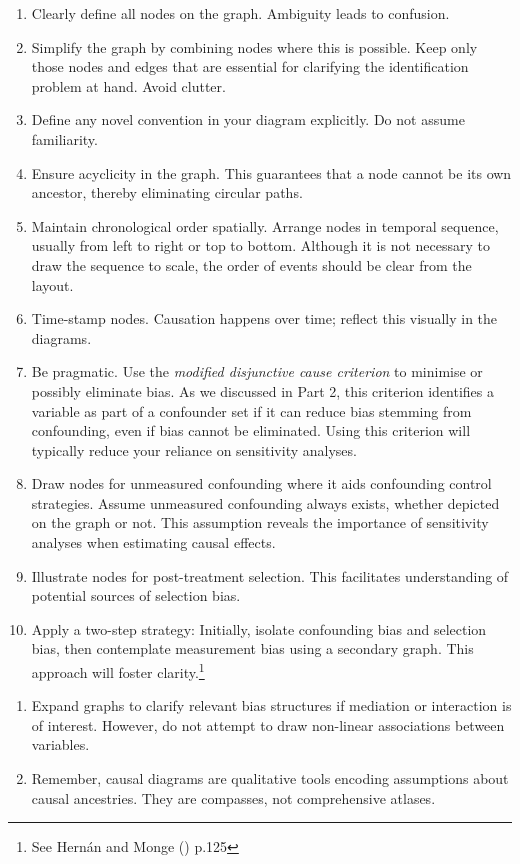 \documentclass[
  singlecolumn,
  9pt]{article}
\begin{document}
\begin{enumerate}
\def\labelenumi{\arabic{enumi}.}
\item
  Clearly define all nodes on the graph. Ambiguity leads to confusion.
\item
  Simplify the graph by combining nodes where this is possible. Keep
  only those nodes and edges that are essential for clarifying the
  identification problem at hand. Avoid clutter.
\item
  Define any novel convention in your diagram explicitly. Do not assume
  familiarity.
\item
  Ensure acyclicity in the graph. This guarantees that a node cannot be
  its own ancestor, thereby eliminating circular paths.
\item
  Maintain chronological order spatially. Arrange nodes in temporal
  sequence, usually from left to right or top to bottom. Although it is
  not necessary to draw the sequence to scale, the order of events
  should be clear from the layout.
\item
  Time-stamp nodes. Causation happens over time; reflect this visually
  in the diagrams.
\item
  Be pragmatic. Use the \emph{modified disjunctive cause criterion} to
  minimise or possibly eliminate bias. As we discussed in Part 2, this
  criterion identifies a variable as part of a confounder set if it can
  reduce bias stemming from confounding, even if bias cannot be
  eliminated. Using this criterion will typically reduce your reliance
  on sensitivity analyses.
\item
  Draw nodes for unmeasured confounding where it aids confounding
  control strategies. Assume unmeasured confounding always exists,
  whether depicted on the graph or not. This assumption reveals the
  importance of sensitivity analyses when estimating causal effects.
\item
  Illustrate nodes for post-treatment selection. This facilitates
  understanding of potential sources of selection bias.
\item
  Apply a two-step strategy: Initially, isolate confounding bias and
  selection bias, then contemplate measurement bias using a secondary
  graph. This approach will foster clarity.\footnote{See Hernán and
    Monge () p.125}
\end{enumerate}

\begin{enumerate}
\def\labelenumi{\arabic{enumi}.}
\setcounter{enumi}{10}
\item
  Expand graphs to clarify relevant bias structures if mediation or
  interaction is of interest. However, do not attempt to draw non-linear
  associations between variables.
\item
  Remember, causal diagrams are qualitative tools encoding assumptions
  about causal ancestries. They are compasses, not comprehensive
  atlases.
\end{enumerate}
\end{document}
